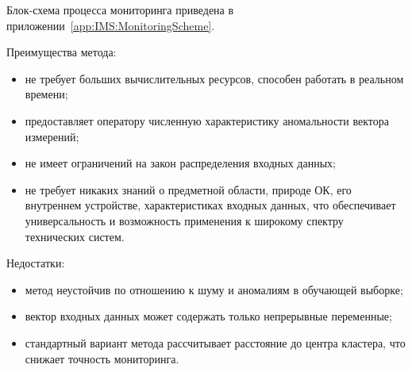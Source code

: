 Блок-схема процесса мониторинга приведена в приложении~\ref{app:IMS:MonitoringScheme}.

Преимущества метода:
\begin{itemize}
	\item не требует больших вычислительных ресурсов, способен работать в реальном времени;
	\item предоставляет оператору численную характеристику аномальности вектора измерений;
	\item не имеет ограничений на закон распределения входных данных;
	\item не требует никаких знаний о предметной области, природе ОК, его внутреннем устройстве, характеристиках входных данных, что обеспечивает универсальность и возможность применения к широкому спектру технических систем.
\end{itemize}

Недостатки:
\begin{itemize}
	\item метод неустойчив по отношению к шуму и аномалиям в обучающей выборке; 
	\item вектор входных данных может содержать только непрерывные переменные;
	\item стандартный вариант метода рассчитывает расстояние до центра кластера, что снижает точность мониторинга.
\end{itemize}